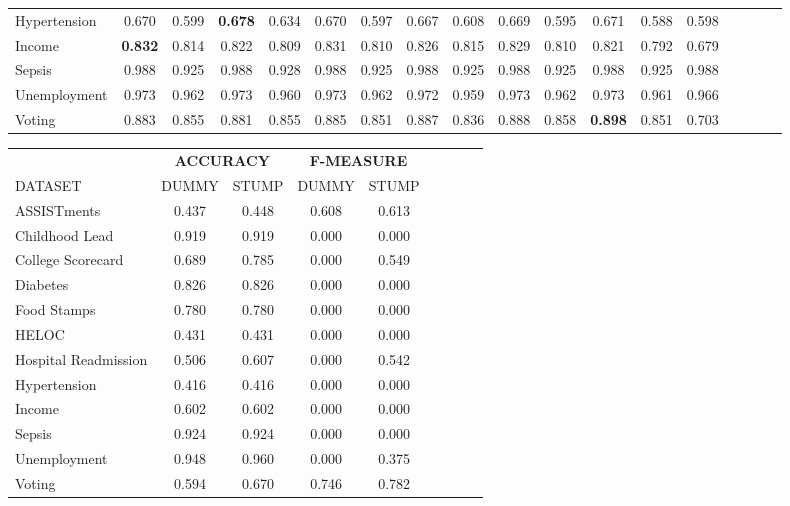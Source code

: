 \documentclass{article}
\begin{document}
\begin{landscape}
\begin{center}
\begin{tabular}{lcc|cc|cc|cc|cc|cc|ccccc}
Hypertension 
    & 0.670
    & 0.599
    & \textbf{0.678}
    & 0.634
    & 0.670
    & 0.597
    & 0.667
    & 0.608
    & 0.669
    & 0.595
    & 0.671
    & 0.588
    & 0.598
    & 
    & 
    & 
    & 
\\
Income 
& \textbf{0.832}
    & 0.814
    & 0.822
    & 0.809
    & 0.831
    & 0.810
    & 0.826
    & 0.815
    & 0.829
    & 0.810
    & 0.821
    & 0.792
    & 0.679
    & 
    & 
    & 
    & 
\\
Sepsis 
    & 0.988
    & 0.925
    & 0.988
    & 0.928
    & 0.988
    & 0.925
    & 0.988
    & 0.925
    & 0.988
    & 0.925
    & 0.988
    & 0.925
    & 0.988
    & 
    & 
    & 
    & 
\\
Unemployment 
    & 0.973
    & 0.962
    & 0.973
    & 0.960
    & 0.973
    & 0.962
    & 0.972
    & 0.959
    & 0.973
    & 0.962
    & 0.973
    & 0.961
    & 0.966
    & 
    & 
    & 
    & 
\\
Voting 
    & 0.883
    & 0.855
    & 0.881
    & 0.855
    & 0.885
    & 0.851
    & 0.887
    & 0.836
    & 0.888
    & 0.858
    & \textbf{0.898}
    & 0.851
    & 0.703
    & 
    & 
    & 
    & 
\\
\bottomrule
\end{tabular}

\vspace{10pt}

\begin{tabular}{l|cc|cc|cccc}
\toprule
    & \multicolumn{2}{c|}{\textbf{ACCURACY}} 
    & \multicolumn{2}{c|}{\textbf{F-MEASURE}} \\

DATASET                   & DUMMY & STUMP & DUMMY & STUMP  \\
\midrule
ASSISTments               & 0.437 & 0.448 & 0.608 & 0.613  \\
Childhood Lead            & 0.919 & 0.919 & 0.000 & 0.000  \\
College Scorecard         & 0.689 & 0.785 & 0.000 & 0.549  \\
Diabetes                  & 0.826 & 0.826 & 0.000 & 0.000  \\
Food Stamps               & 0.780 & 0.780 & 0.000 & 0.000  \\
HELOC                     & 0.431 & 0.431 & 0.000 & 0.000  \\
Hospital Readmission      & 0.506 & 0.607 & 0.000 & 0.542  \\
Hypertension              & 0.416 & 0.416 & 0.000 & 0.000  \\
Income                    & 0.602 & 0.602 & 0.000 & 0.000  \\
Sepsis                    & 0.924 & 0.924 & 0.000 & 0.000  \\
Unemployment              & 0.948 & 0.960 & 0.000 & 0.375  \\
Voting                    & 0.594 & 0.670 & 0.746 & 0.782  \\
\bottomrule
\end{tabular}
\vspace{10pt}


\end{center}
\end{landscape}
\end{document}
